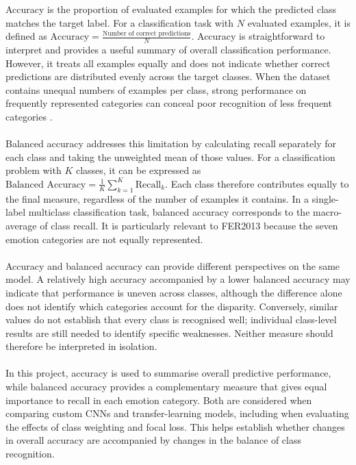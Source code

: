 \documentclass[12pt, a4paper]{report}
\begin{document}
				Accuracy is the proportion of evaluated examples for which the predicted class matches the target label. For a classification task with $N$ evaluated examples, it is defined as $\text{Accuracy}=\frac{\text{Number of correct predictions}}{N}$. Accuracy is straightforward to interpret and provides a useful summary of overall classification performance. However, it treats all examples equally and does not indicate whether correct predictions are distributed evenly across the target classes. When the dataset contains unequal numbers of examples per class, strong performance on frequently represented categories can conceal poor recognition of less frequent categories \cite{Opitz2024ClassificationMetrics, Farhadpour2024MetricsImbalance}.\\\\
				Balanced accuracy addresses this limitation by calculating recall separately for each class and taking the unweighted mean of those values. For a classification problem with $K$ classes, it can be expressed as $\text{Balanced Accuracy}=\frac{1}{K}\sum_{k=1}^{K}\text{Recall}_{k}$. Each class therefore contributes equally to the final measure, regardless of the number of examples it contains. In a single-label multiclass classification task, balanced accuracy corresponds to the macro-average of class recall. It is particularly relevant to FER2013 because the seven emotion categories are not equally represented.\\\\
				Accuracy and balanced accuracy can provide different perspectives on the same model. A relatively high accuracy accompanied by a lower balanced accuracy may indicate that performance is uneven across classes, although the difference alone does not identify which categories account for the disparity. Conversely, similar values do not establish that every class is recognised well; individual class-level results are still needed to identify specific weaknesses. Neither measure should therefore be interpreted in isolation.\\\\
				In this project, accuracy is used to summarise overall predictive performance, while balanced accuracy provides a complementary measure that gives equal importance to recall in each emotion category. Both are considered when comparing custom CNNs and transfer-learning models, including when evaluating the effects of class weighting and focal loss. This helps establish whether changes in overall accuracy are accompanied by changes in the balance of class recognition.
				
\end{document}
